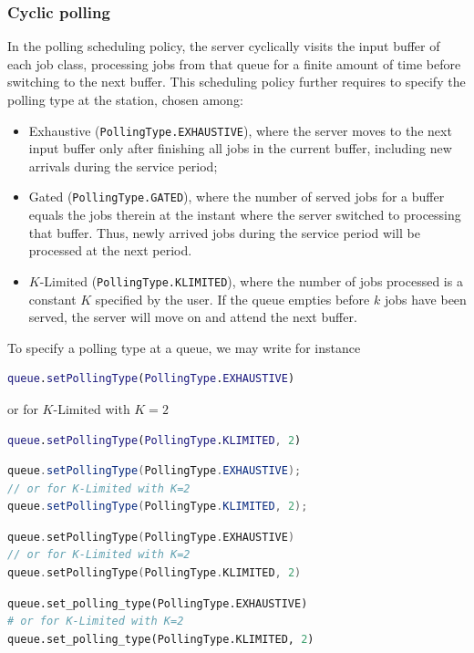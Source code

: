 \subsubsection{Cyclic polling}
In the polling scheduling policy, the server cyclically visits the input buffer of each job class, processing jobs from that queue for a finite amount of time before switching to the next buffer. This scheduling policy further requires to specify the polling type at the station, chosen among:
\begin{itemize}
    \item Exhaustive (\texttt{PollingType.EXHAUSTIVE}), where the server moves to the next input buffer only after finishing all jobs in the current buffer, including new arrivals during the service period;
    \item Gated (\texttt{PollingType.GATED}), where the number of served jobs for a buffer equals the jobs therein at the instant where the server switched to processing that buffer. Thus, newly arrived jobs during the service period will be processed at the next period.
    \item $K$-Limited (\texttt{PollingType.KLIMITED}), where the number of jobs processed is a constant $K$ specified by the user. If the queue empties before $k$ jobs have been served, the server will move on and attend the next buffer.
\end{itemize}
To specify a polling type at a queue, we may write for instance
\begin{MATLAB}
\begin{lstlisting}[language = matlab]
queue.setPollingType(PollingType.EXHAUSTIVE)
\end{lstlisting}
or for $K$-Limited with $K=2$
\begin{lstlisting}[language = matlab]
queue.setPollingType(PollingType.KLIMITED, 2)
\end{lstlisting}
\end{MATLAB}
\begin{JAVA}
\begin{lstlisting}[language=java, basicstyle=\ttfamily\scriptsize]
queue.setPollingType(PollingType.EXHAUSTIVE);
// or for K-Limited with K=2
queue.setPollingType(PollingType.KLIMITED, 2);
\end{lstlisting}
\end{JAVA}
\begin{KOTLIN}
\begin{lstlisting}[language=kotlin, basicstyle=\ttfamily\scriptsize]
queue.setPollingType(PollingType.EXHAUSTIVE)
// or for K-Limited with K=2
queue.setPollingType(PollingType.KLIMITED, 2)
\end{lstlisting}
\end{KOTLIN}
\begin{PYTHON}
\begin{lstlisting}[language=python]
queue.set_polling_type(PollingType.EXHAUSTIVE)
# or for K-Limited with K=2
queue.set_polling_type(PollingType.KLIMITED, 2)
\end{lstlisting}
\end{PYTHON}
